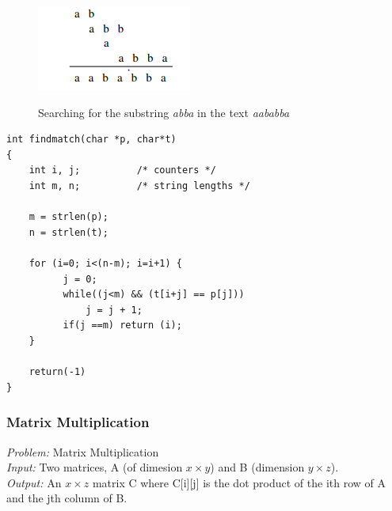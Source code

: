 \begin{figure}[H]
  \centering
     \includegraphics[scale=0.6]{./2_6.png}
  \label{fig:demo-diagram}
  \caption{Searching for the substring \emph{abba} in the text \emph{aababba}}
\end{figure}

\begin{verbatim}
int findmatch(char *p, char*t)
{
    int i, j;          /* counters */
    int m, n;          /* string lengths */

    m = strlen(p);
    n = strlen(t);

    for (i=0; i<(n-m); i=i+1) {
          j = 0;
          while((j<m) && (t[i+j] == p[j]))
              j = j + 1;
          if(j ==m) return (i);
    }

    return(-1)
}
\end{verbatim}


\subsubsection{Matrix Multiplication}

\emph{Problem:} Matrix Multiplication\\
\emph{Input:} Two matrices, A (of dimesion  $x \times y$) and B (dimension $y \times z$).\\
\emph{Output:} An $x \times z$ matrix C where C[i][j] is the dot product of the ith row of A and the jth column of B.\\
